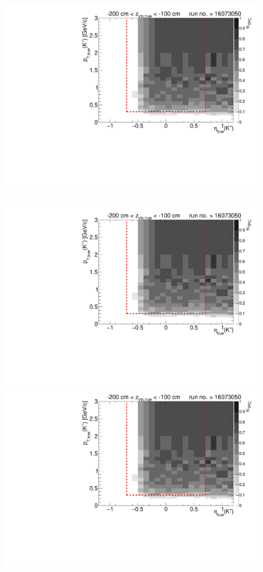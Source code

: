 \begin{figure}[hb]
{		\includegraphics[width=\linewidth,page=17]{graphics/eff/Eff2D_TPC_kaon_Plus_RunRange2.pdf}
	}~
	\parbox{0.495\textwidth}{
		\centering
		\includegraphics[width=\linewidth,page=12]{graphics/eff/Eff2D_TPC_kaon_Plus_RunRange2.pdf}\\
		\includegraphics[width=\linewidth,page=14]{graphics/eff/Eff2D_TPC_kaon_Plus_RunRange2.pdf}\\
}
\end{figure}
